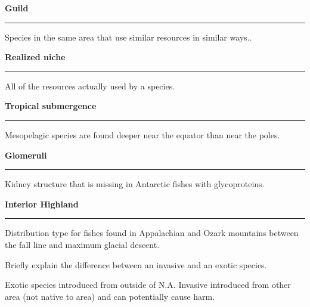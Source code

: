 \documentclass[11pt, addpoints]{exam}
\newcommand*\Matching[1]{
\ifprintanswers
	\textbf{#1}
\else
	\rule{2.1in}{0.5pt}
\fi
}
\newlength\matchlena
\newlength\matchlenb
\newcommand\MatchQuestion[2]{%
	\setlength\matchlenb{\linewidth}
	\addtolength\matchlenb{-\matchlena}
	\parbox[t]{\matchlena}{\Matching{#1}}\enspace\parbox[t]{\matchlenb}{#2}}
\newcommand{\bumppoints}[1]{%
	\addtocounter{numpoints}{#1}
}
\newcommand*\AnswerBox[3]{%
    \parbox[t][#1]{0.92\textwidth}{%
    \begin{solution}#3\end{solution}}
    \vspace*{\stretch{#2}}
}
\begin{document}
\begin{questions}


\vspace{-1\baselineskip}
\fullwidth{%

}
\vspace{0.4\baselineskip}

\bumppoints{10}

\question\MatchQuestion{Guild}{Species in the same area that use similar resources in similar ways..}
\vspace{0.4\baselineskip}


\question\MatchQuestion{Realized niche}{All of the resources actually used by a species.}
\vspace{0.5\baselineskip}

\question\MatchQuestion{Tropical submergence}{Mesopelagic species are found deeper near the equator than near the poles.}
\vspace{0.4\baselineskip}

\question\MatchQuestion{Glomeruli}{Kidney structure that is missing in Antarctic fishes with glycoproteins.}
\vspace{0.4\baselineskip}

\question\MatchQuestion{Interior Highland}{Distribution type for fishes found in Appalachian and Ozark mountains between the fall line and maximum glacial descent.}
\vspace{0.4\baselineskip}

\question[5]
Briefly explain the difference between an invasive and an exotic species. %

\AnswerBox{0.2\textheight}{1}{%
Exotic species introduced from outside of N.A. Invasive introduced from other area (not native to area) and can potentially cause harm.}

\newpage






\end{questions}
\end{document}

